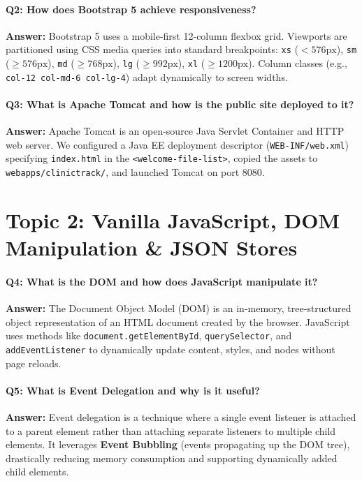\documentclass[12pt,a4paper,oneside]{report}
\begin{document}
\paragraph{Q2: How does Bootstrap 5 achieve responsiveness?}
\textbf{Answer:} Bootstrap 5 uses a mobile-first 12-column flexbox grid. Viewports are partitioned using CSS media queries into standard breakpoints: \texttt{xs} ($<576\text{px}$), \texttt{sm} ($\ge 576\text{px}$), \texttt{md} ($\ge 768\text{px}$), \texttt{lg} ($\ge 992\text{px}$), \texttt{xl} ($\ge 1200\text{px}$). Column classes (e.g., \texttt{col-12 col-md-6 col-lg-4}) adapt dynamically to screen widths.

\paragraph{Q3: What is Apache Tomcat and how is the public site deployed to it?}
\textbf{Answer:} Apache Tomcat is an open-source Java Servlet Container and HTTP web server. We configured a Java EE deployment descriptor (\texttt{WEB-INF/web.xml}) specifying \texttt{index.html} in the \texttt{<welcome-file-list>}, copied the assets to \texttt{webapps/clinictrack/}, and launched Tomcat on port 8080.

\section{Topic 2: Vanilla JavaScript, DOM Manipulation \& JSON Stores}
\paragraph{Q4: What is the DOM and how does JavaScript manipulate it?}
\textbf{Answer:} The Document Object Model (DOM) is an in-memory, tree-structured object representation of an HTML document created by the browser. JavaScript uses methods like \texttt{document.getElementById}, \texttt{querySelector}, and \texttt{addEventListener} to dynamically update content, styles, and nodes without page reloads.

\paragraph{Q5: What is Event Delegation and why is it useful?}
\textbf{Answer:} Event delegation is a technique where a single event listener is attached to a parent element rather than attaching separate listeners to multiple child elements. It leverages \textbf{Event Bubbling} (events propagating up the DOM tree), drastically reducing memory consumption and supporting dynamically added child elements.
\end{document}
